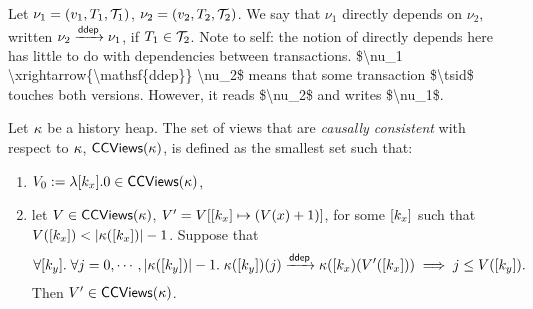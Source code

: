\begin{definition}
Let $\nu_1 = (v_1, T_1, \mathcal{T}_1)$, $\nu_2 = (v_2, T_2, \mathcal{T}_2)$. 
We say that $\nu_1$ directly depends on $\nu_2$, written $\nu_2 \xrightarrow{\mathsf{ddep}} \nu_1$, 
 if $T_1 \in \mathcal{T}_2$. 
\ac{Note to self: the notion of directly depends here has little to do with dependencies 
between transactions. $\nu_1 \xrightarrow{\mathsf{ddep}} \nu_2$ means that 
some transaction $\tsid$ touches both versions. However, it reads $\nu_2$ and 
writes $\nu_1$.}

Let $\kappa$ be a history heap. The set of views that are \emph{causally consistent} 
with respect to $\kappa$, $\mathsf{CCViews}(\kappa)$, is defined as the smallest set such that: 
\begin{enumerate} 
\item $V_0 := \lambda [k_x].0 \in \mathsf{CCViews}(\kappa)$, 
\item let $V \in \mathsf{CCViews}(\kappa)$, $V' = V[[k_x] \mapsto (V(x) + 1)]$, 
for some $[k_x]$ such that $V([k_x]) < \lvert \kappa([k_x]) \rvert - 1$.
Suppose that 
\[
\forall [k_y].\;\forall j = 0,\cdots, \lvert \kappa([k_y]) \rvert -1.\; 
\kappa([k_y])(j) \xrightarrow{\mathsf{ddep}} \kappa([k_{x})(V'([k_x])) 
\implies j \leq V([k_y]).
\]
Then $V' \in \mathsf{CCViews}(\kappa)$.
\end{enumerate}
\end{definition}


